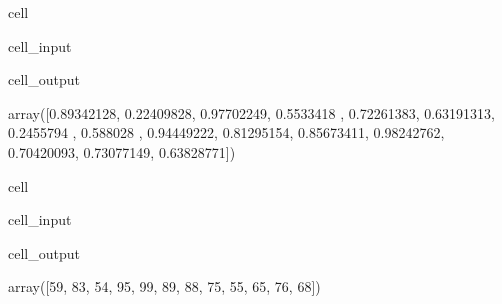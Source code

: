 \documentclass[letterpaper,10pt,english]{jupyterBook}
\begin{document}
\begin{sphinxuseclass}{cell}\begin{sphinxVerbatimInput}

\begin{sphinxuseclass}{cell_input}
\begin{sphinxVerbatim}[commandchars=\\\{\}]
\end{sphinxVerbatim}

\end{sphinxuseclass}\end{sphinxVerbatimInput}
\begin{sphinxVerbatimOutput}

\begin{sphinxuseclass}{cell_output}
\begin{sphinxVerbatim}[commandchars=\\\{\}]
array([0.89342128, 0.22409828, 0.97702249, 0.5533418 , 0.72261383,
       0.63191313, 0.2455794 , 0.588028  , 0.94449222, 0.81295154,
       0.85673411, 0.98242762, 0.70420093, 0.73077149, 0.63828771])
\end{sphinxVerbatim}

\end{sphinxuseclass}\end{sphinxVerbatimOutput}

\end{sphinxuseclass}
\begin{sphinxuseclass}{cell}\begin{sphinxVerbatimInput}

\begin{sphinxuseclass}{cell_input}
\begin{sphinxVerbatim}[commandchars=\\\{\}]
\end{sphinxVerbatim}

\end{sphinxuseclass}\end{sphinxVerbatimInput}
\begin{sphinxVerbatimOutput}

\begin{sphinxuseclass}{cell_output}
\begin{sphinxVerbatim}[commandchars=\\\{\}]
array([59, 83, 54, 95, 99, 89, 88, 75, 55, 65, 76, 68])
\end{sphinxVerbatim}

\end{sphinxuseclass}\end{sphinxVerbatimOutput}

\end{sphinxuseclass}
\end{document}
